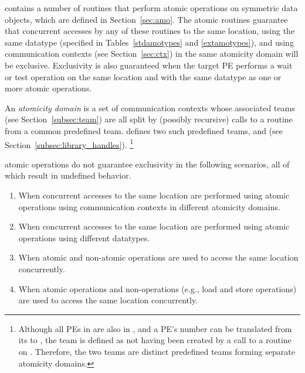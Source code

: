 \openshmem contains a number of routines that perform atomic operations on
symmetric data objects, which are defined in Section~\ref{sec:amo}.
The atomic routines
guarantee that concurrent accesses by any of these routines to the same
location, using the same datatype (specified in Tables~\ref{stdamotypes} and
\ref{extamotypes}), and using communication contexts (see Section~\ref{sec:ctx})
in the same atomicity domain will be exclusive.
Exclusivity is also guaranteed when the target \ac{PE} performs a wait or test
operation on the same location and with the same datatype as one or more atomic
operations.

An \openshmem \emph{atomicity domain} is a set of communication
contexts whose associated teams (see Section~\ref{subsec:team}) are
all split by (possibly recursive) calls to a
 routine from a common predefined team.
\openshmem defines two such predefined teams, 
and  (see Section~\ref{subsec:library_handles}).%
\footnote{
  Although all \acp{PE} in  are also
  in , and a \ac{PE}'s number can be
  translated from its  to
  , the
   team is defined as not having
  been created by a call to a  routine on
  .
  Therefore, the two teams are distinct predefined teams forming
  separate atomicity domains.
}

\openshmem atomic operations do not guarantee exclusivity in the following
scenarios, all of which result in undefined behavior.
\begin{enumerate}
    \item \label{amo-scenario/1}
        When concurrent accesses to the same location are performed using
        \openshmem atomic operations using communication contexts in
        different atomicity domains.
    \item \label{amo-scenario/2}
        When concurrent accesses to the same location are performed using
        \openshmem atomic operations using different datatypes.
    \item \label{amo-scenario/3}
        When atomic and non-atomic \openshmem operations are used to access
        the same location concurrently.
    \item \label{amo-scenario/4}
        When \openshmem atomic operations and non-\openshmem operations (e.g.,
        load and store operations) are used to access the same location
        concurrently.
\end{enumerate}

